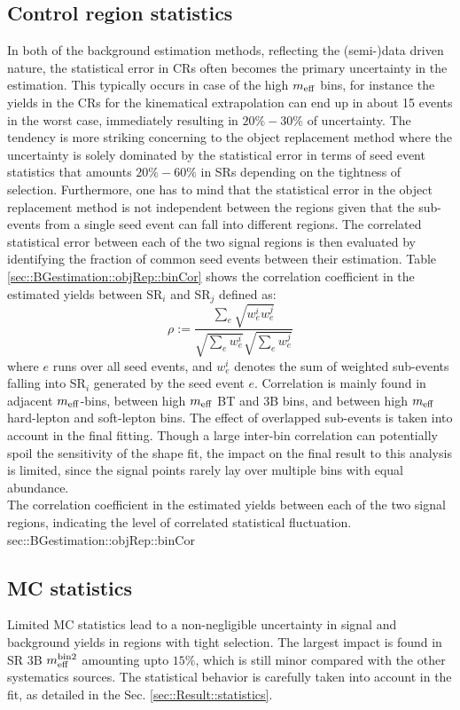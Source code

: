 \subsection{Control region statistics}
In both of the background estimation methods, reflecting the (semi-)data driven nature, the statistical error in CRs often becomes the primary uncertainty in the estimation.
This typically occurs in case of the high $m_{\mathrm{eff}}$ bins, for instance the yields in the CRs for the kinematical extrapolation can end up in about 15 events in the worst case, immediately resulting in $20\%-30\%$ of uncertainty. The tendency is more striking concerning to the object replacement method where the uncertainty is solely dominated by the statistical error in terms of seed event statistics that amounts $20\%-60\%$ in SRs depending on the tightness of selection. Furthermore, one has to mind that the statistical error in the object replacement method is not independent between the regions given that the sub-events from a single seed event can fall into different regions. The correlated statistical error between each of the two signal regions is then evaluated by identifying the fraction of common seed events between their estimation. 
Table \ref{sec::BGestimation::objRep::binCor} shows the correlation coefficient in the estimated yields between SR$_i$ and SR$_j$ defined as:
$$\rho := \frac{\sum_e \sqrt{w^{i}_e w^{j}_e}}{\sqrt{\sum_e w^{i}_e} \sqrt{\sum_e w^{j}_e}}$$
where $e$ runs over all seed events, and $w^i_e$ denotes the sum of weighted sub-events falling into SR$_i$ generated by the seed event $e$. 
Correlation is mainly found in adjacent $m_{\mathrm{eff}}$-bins, between high $m_{\mathrm{eff}}$ BT and 3B bins, and between high $m_{\mathrm{eff}}$ hard-lepton and soft-lepton bins. 
The effect of overlapped sub-events is taken into account in the final fitting. 
Though a large inter-bin correlation can potentially spoil the sensitivity of the shape fit, 
the impact on the final result to this analysis is limited, since the signal points rarely lay over multiple bins with equal abundance.  \\

{The correlation coefficient in the estimated yields between each of the two signal regions, indicating the level of correlated statistical fluctuation.}
{sec::BGestimation::objRep::binCor}



\subsection{MC statistics}
Limited MC statistics lead to a non-negligible uncertainty in signal and background yields in regions with tight selection. The largest impact is found in SR 3B $m_{\mathrm{eff}}^{\mathrm{bin 2}}$ amounting upto $15\%$, which is still minor compared with the other systematics sources. The statistical behavior is carefully taken into account in the fit, as detailed in the Sec. \ref{sec::Result::statistics}.








